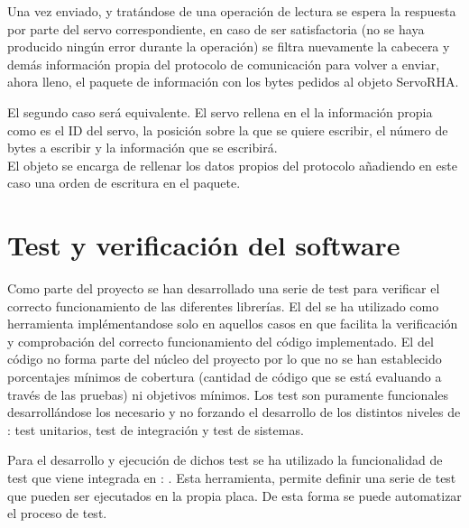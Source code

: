 	Una vez enviado, y tratándose de una operación de lectura se espera la respuesta por parte del servo correspondiente, en caso de ser satisfactoria (no se haya producido ningún error durante la operación) se filtra nuevamente la cabecera y demás información propia del protocolo de comunicación para volver a enviar, ahora lleno, el paquete de información con los bytes pedidos al objeto ServoRHA.
	
	
	El segundo caso será equivalente. El servo rellena en el  la información propia como es el ID del servo, la posición sobre la que se quiere escribir, el número de bytes a escribir y la información que se escribirá.
	\\ 
	El objeto  se encarga de rellenar los datos propios del protocolo añadiendo en este caso una orden de escritura en el paquete.
	\\ 
	
	
\section{Test y verificación del software} \label{sec:SW:test}
    Como parte del proyecto se han desarrollado una serie de test para verificar el correcto funcionamiento de las diferentes librerías. El  del  se ha utilizado como herramienta implémentandose solo en aquellos casos en que facilita la verificación y comprobación del correcto funcionamiento del código implementado. El  del código no forma parte del núcleo del proyecto por lo que no se han establecido porcentajes mínimos de cobertura (cantidad de código que se está evaluando a través de las pruebas) ni objetivos mínimos. Los test son puramente funcionales desarrollándose los necesario y no forzando el desarrollo de los distintos niveles de : test unitarios, test de integración y test de sistemas. 

    Para el desarrollo y ejecución de dichos test se ha utilizado la funcionalidad de test que viene integrada en : . Esta herramienta, permite definir una serie de test que pueden ser ejecutados en la propia placa. De esta forma se puede automatizar el proceso de test.

